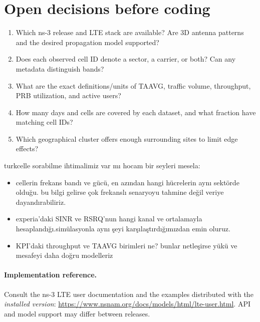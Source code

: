 \documentclass[11pt,a4paper]{article}
\newenvironment{progress}{\par\smallskip\color{blue}}{\par\smallskip}
\begin{document}
\section{Open decisions before coding}
\begin{enumerate}[nosep]
\item Which ns-3 release and LTE stack are available? Are 3D antenna patterns and the desired propagation model supported?
\item Does each observed cell ID denote a sector, a carrier, or both? Can any metadata distinguish bands?
\item What are the exact definitions/units of TAAVG, traffic volume, throughput, PRB utilization, and active users?
\item How many days and cells are covered by each dataset, and what fraction have matching cell IDs?
\item Which geographical cluster offers enough surrounding sites to limit edge effects?
\end{enumerate}

\begin{progress}
turkcelle sorabilme ihtimalimiz var mı hocam bir seyleri mesela:
\begin{itemize}[nosep]
\item cellerin frekans bandı ve gücü, en azından hangi hücrelerin aynı sektörde olduğu. bu bilgi gelirse çok frekanslı senaryoyu tahmine değil veriye dayandırabiliriz.
\item experia'daki SINR ve RSRQ'nun hangi kanal ve ortalamayla hesaplandığı.simülasyonla aynı şeyi karşılaştırdığımızdan emin oluruz.
\item KPI'daki throughput ve TAAVG birimleri ne? bunlar netleşirse yükü ve mesafeyi daha doğru modelleriz
\end{itemize}
\end{progress}

\paragraph{Implementation reference.} Consult the ns-3 LTE user documentation and the examples distributed with the \emph{installed version}: \url{https://www.nsnam.org/docs/models/html/lte-user.html}. API and model support may differ between releases.
\end{document}
